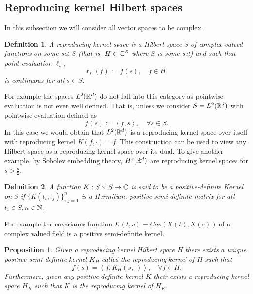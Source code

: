 \documentclass[12pt]{article}
\newtheorem{proposition}{Proposition}
\newtheorem{definition}{Definition}
\newcommand{\br}[1]{\left\langle#1\right\rangle}
\begin{document}
\subsection{Reproducing kernel Hilbert spaces}
In this subsection we will consider all vector spaces to be complex.
\begin{definition}
    A reproducing kernel space is a Hilbert space $S$ of complex valued functions on some set $S$ (that is, $H\subset \mathbb{C}^S$ where $S$ is some set) and such that  point evaluation $\ell _s$, $$\ell _s(f):=f(s),\quad f\in H,$$ is continuous for all $s\in S$.
\end{definition}
For example the spaces $L^2({\mathbb R}^d)$ do not fall into this category as pointwise evaluation is not even well defined. That is, unless we consider $S=L^2({\mathbb R}^d)$ with pointwise evaluation defined as
\begin{equation*}
    f(s):=\br{f,s},\quad\forall s\in S.
\end{equation*}
In this case we would obtain that $L^2({\mathbb R}^d)$ is a reproducing kernel space over itself with reproducing kernel $K(f,\cdot )=f.$ This construction can be used to view any Hilbert space as a reproducing kernel space over its dual. To give another example, by Sobolev embedding theory, $H^s({\mathbb R}^d)$ are reproducing kernel spaces for $s>\frac{d}{2}$.
\begin{definition}
    A function $K:S\times S\to \mathbb{C}$ is said to be a \emph{positive-definite  Kernel} on $S$ if  $\{K(t_i,t_j)\}_{i,j=1}^n$ is a Hermitian, positive semi-definite matrix for all $t_i \in S,n \in \mathbb{N}$.
\end{definition}
For example the covariance function $K(t,s)=Cov(X(t),X(s))$ of a complex valued field is a positive semi-definite kernel.
\begin{proposition}\label{existence reproducing kernel}
    Given a reproducing kernel Hilbert space $H$ there exists a unique positive semi-definite kernel $K_H$ called the \emph{reproducing kernel} of $H$ such that
    \begin{equation*}
        f(s)=\br{f,K_H(s,\cdot )},\quad\forall f\in H.
    \end{equation*}
    Furthermore, given any positive-definite kernel $K$ their exists a reproducing kernel space $H_K$ such that $K$ is the reproducing kernel of $H_K$.
\end{proposition}
\end{document}
